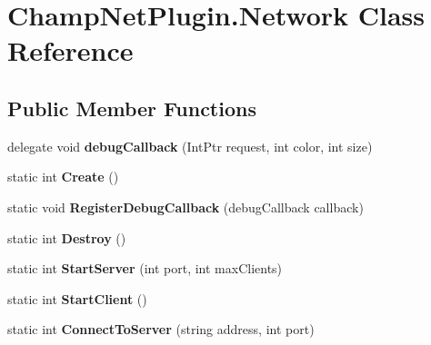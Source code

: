 \hypertarget{class_champ_net_plugin_1_1_network}{\section{Champ\-Net\-Plugin.\-Network Class Reference}
\label{class_champ_net_plugin_1_1_network}
}
\subsection*{Public Member Functions}
\begin{DoxyCompactItemize}
\item 
\hypertarget{class_champ_net_plugin_1_1_network_ae91e1558fdacd55163986aaf2edf3c75}{delegate void {\bfseries debug\-Callback} (Int\-Ptr request, int color, int size)}\label{class_champ_net_plugin_1_1_network_ae91e1558fdacd55163986aaf2edf3c75}

\item 
\hypertarget{class_champ_net_plugin_1_1_network_aac69b7dd1eb986a17ba005cded2581fa}{static int {\bfseries Create} ()}\label{class_champ_net_plugin_1_1_network_aac69b7dd1eb986a17ba005cded2581fa}

\item 
\hypertarget{class_champ_net_plugin_1_1_network_a33f8a1666e92815fc3968ad98fd3f782}{static void {\bfseries Register\-Debug\-Callback} (debug\-Callback callback)}\label{class_champ_net_plugin_1_1_network_a33f8a1666e92815fc3968ad98fd3f782}

\item 
\hypertarget{class_champ_net_plugin_1_1_network_a38e92ac395f9860fa696d0194ca04f4b}{static int {\bfseries Destroy} ()}\label{class_champ_net_plugin_1_1_network_a38e92ac395f9860fa696d0194ca04f4b}

\item 
\hypertarget{class_champ_net_plugin_1_1_network_a9d04fdd4e422f9dbf0e20bbbd4209884}{static int {\bfseries Start\-Server} (int port, int max\-Clients)}\label{class_champ_net_plugin_1_1_network_a9d04fdd4e422f9dbf0e20bbbd4209884}

\item 
\hypertarget{class_champ_net_plugin_1_1_network_acaf000c31710d5c8f2720a6143773c4d}{static int {\bfseries Start\-Client} ()}\label{class_champ_net_plugin_1_1_network_acaf000c31710d5c8f2720a6143773c4d}

\item 
\hypertarget{class_champ_net_plugin_1_1_network_a82f643f5065fc2d081be45de41e89aff}{static int {\bfseries Connect\-To\-Server} (string address, int port)}\label{class_champ_net_plugin_1_1_network_a82f643f5065fc2d081be45de41e89aff}


\end{DoxyCompactItemize}
